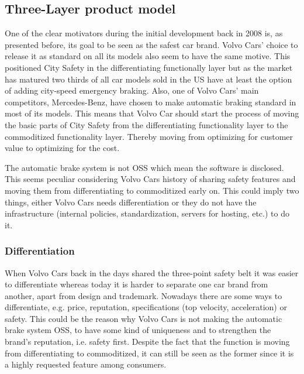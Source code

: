 \documentclass[conference]{IEEEtran}
\begin{document}
\subsection{Three-Layer product model}
One of the clear motivators during the initial development back in 2008 is, as presented before, its goal to be seen as the safest car brand. Volvo Cars' choice to release it as standard on all its models also seem to have the same motive. This positioned City Safety in the differentiating functionally layer but as the market has matured two thirds of all car models sold in the US have at least the option of adding city-speed emergency braking. Also, one of Volvo Cars' main competitors, Mercedes-Benz, have chosen to make automatic braking standard in most of its models.  \cite{AEBStatistics} This means that Volvo Car should start the process of moving the basic parts of City Safety from the differentiating functionality layer to the commoditized functionality layer. Thereby moving from optimizing for customer value to optimizing for the cost.

The automatic brake system is not OSS which mean the software is disclosed. This seems peculiar considering Volvo Cars history of sharing safety features and moving them from differentiating to commoditized early on. This could imply two things, either Volvo Cars needs differentiation or they do not have the infrastructure (internal policies, standardization, servers for hosting, etc.) to do it.

\subsubsection{Differentiation}
When Volvo Cars back in the days shared the three-point safety belt it was easier to differentiate whereas today it is harder to separate one car brand from another, apart from design and trademark. Nowadays there are some ways to differentiate, e.g. price, reputation, specifications (top velocity, acceleration) or safety. This could be the reason why Volvo Cars is not making the automatic brake system OSS, to have some kind of uniqueness and to strengthen the brand's reputation, i.e. safety first. Despite the fact that the function is moving from differentiating to commoditized, it can still be seen as the former since it is a highly requested feature among consumers. \cite{AEBStatistics,VolvoVision}
\end{document}
